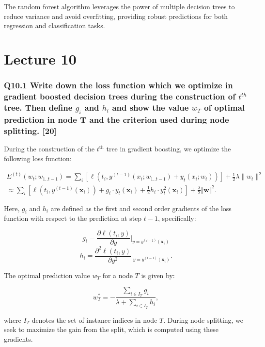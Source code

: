 \documentclass[11pt]{article}
\begin{document}
The random forest algorithm leverages the power of multiple decision trees to reduce variance and avoid overfitting, providing robust predictions for both regression and classification tasks.

\part{Lecture 10}

\section{Q10.1 Write down the loss function which we optimize in gradient boosted decision trees during the construction of $t^{th}$ tree. Then define $g_i$ and $h_i$ and show the value $w_T$ of optimal prediction in node T and the criterion used during node splitting. [20]}

During the construction of the $t^{\text{th}}$ tree in gradient boosting, we optimize the following loss function:

\begin{align*}
E^{(t)}(w_t; w_{1..t-1}) = \sum_{i} \left[ \ell(t_i, y^{(t-1)}(x_i; w_{1..t-1}) + y_t(x_i; w_t)) \right] + \frac{1}{2}\lambda \|w_t\|^2 \\
\approx \sum_{i} \left[ \ell (t_i, y^{(t-1)}(\mathbf{x}_i)) + g_i \cdot y_t(\mathbf{x}_i) + \frac{1}{2} h_i \cdot y_t^2(\mathbf{x}_i) \right] + \frac{\lambda}{2} \Vert \mathbf{w} \Vert^2.
\end{align*}

Here, $g_i$ and $h_i$ are defined as the first and second order gradients of the loss function with respect to the prediction at step $t-1$, specifically:

\begin{equation}
g_i = \frac{\partial \ell(t_i, y)}{\partial y} \bigg|_{y = y^{(t-1)}(\mathbf{x}_i)}
\end{equation}
\begin{equation}
h_i = \frac{\partial^2 \ell(t_i, y)}{\partial y^2} \bigg|_{y = y^{(t-1)}(\mathbf{x}_i)}.
\end{equation}

The optimal prediction value $w_T$ for a node $T$ is given by:

\begin{equation}
w_T^* = - \frac{\sum_{i \in I_T} g_i}{\lambda + \sum_{i \in I_T} h_i},
\end{equation}

where $I_T$ denotes the set of instance indices in node $T$. During node splitting, we seek to maximize the gain from the split, which is computed using these gradients.
\end{document}
